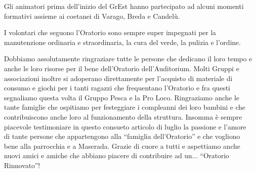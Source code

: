 Gli animatori prima dell’inizio del GrEst hanno partecipato ad alcuni momenti formativi assieme ai coetanei di Varago, Breda e Candelù.



I volontari che seguono l’Oratorio sono sempre super impegnati per la manutenzione ordinaria e straordinaria, la cura del verde, la pulizia e l’ordine.



Dobbiamo assolutamente ringraziare tutte le persone che dedicano il loro tempo e anche le loro risorse per il bene dell’Oratorio dell'Auditorium. Molti Gruppi e associazioni inoltre si adoperano direttamente per l’acquisto di materiale di consumo e giochi per i tanti ragazzi che frequentano l’Oratorio e fra questi segnaliamo questa volta il Gruppo Pesca e la Pro Loco. Ringraziamo anche le tante famiglie che ospitiamo per festeggiare i compleanni dei loro bambini e che contribuiscono anche loro al funzionamento della struttura.
Insomma è sempre piacevole testimoniare in questo consueto articolo di luglio la passione e l’amore di tante persone che appartengono alla “famiglia dell’Oratorio” e che vogliono bene alla parrocchia e a Maserada. Grazie di cuore a tutti e aspettiamo anche nuovi amici e amiche che abbiano piacere di contribuire ad un... ``Oratorio Rinnovato''!
 
